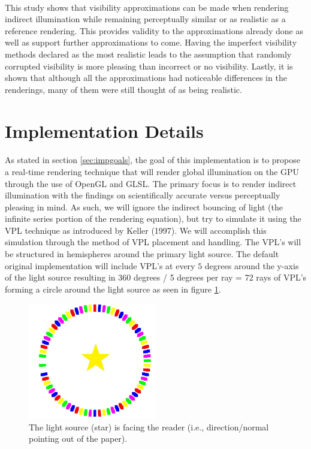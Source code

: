 \paragraph{}
This study shows that visibility approximations can be made when rendering indirect illumination while remaining perceptually similar or as realistic as a reference rendering.  This provides validity to the approximations already done as well as support further approximations to come.  Having the imperfect visibility methods declared as the most realistic leads to the assumption that randomly corrupted visibility is more pleasing than incorrect or no visibility.  Lastly, it is shown that although all the approximations had noticeable differences in the renderings, many of them were still thought of as being realistic.

\section{Implementation Details} \label{sec:impdetails}
\paragraph{}
As stated in section \ref{sec:impgoals}, the goal of this implementation is to propose a real-time rendering technique that will render global illumination on the GPU through the use of OpenGL and GLSL.  The primary focus is to render indirect illumination with the findings on scientifically accurate versus perceptually pleasing in mind.  As such, we will ignore the indirect bouncing of light (the infinite series portion of the rendering equation), but try to simulate it using the VPL technique as introduced by Keller (1997).  We will accomplish this simulation through the method of VPL placement and handling.  The VPL's will be structured in hemispheres around the primary light source.  The default original implementation will include VPL's at every $5$ degrees around the y-axis of the light source resulting in 360 degrees / 5 degrees per ray = 72 rays of VPL's forming a circle around the light source as seen in figure \ref{fig:3.1}.

\begin{figure}[h!]
  \centering
    \includegraphics[width=0.5\textwidth]{Figure31.jpg}
  \caption{The light source (star) is facing the reader (i.e., direction/normal pointing out of the paper).}
	\label{fig:3.1}
\end{figure}

